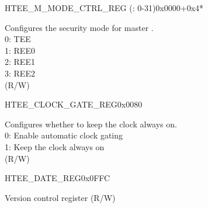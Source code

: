 \begin{register}{H}{TEE\_M\_MODE\_CTRL\_REG (: 0-31)}{0x0000+0x4*}\label{regdesc:TEEM0MODECTRLREG}
%
%
\regnewline%
\begin{regdesc}\begin{reglist}
\label{fielddesc:TEEM0MODE}\item [TEE\_M\regindex{n}\_MODE] Configures the security mode for master .\\ 
0: TEE \\
1: REE0 \\
2: REE1 \\
3: REE2  \\
(R/W)
\end{reglist}\end{regdesc}
\end{register}

\begin{register}{H}{TEE\_CLOCK\_GATE\_REG}{0x0080}\label{regdesc:TEECLOCKGATEREG}
%
%
\regnewline%
\begin{regdesc}\begin{reglist}
\label{fielddesc:TEECLKEN}\item [TEE\_CLK\_EN] Configures whether to keep the clock always on.\\ 
0: Enable automatic clock gating \\ 
1: Keep the clock always on  \\ (R/W)
\end{reglist}\end{regdesc}
\end{register}


\begin{register}{H}{TEE\_DATE\_REG}{0x0FFC}\label{regdesc:TEEDATEREG}
%
%
\regnewline%
\begin{regdesc}\begin{reglist}
\label{fielddesc:TEEDATEREG}\item [TEE\_DATE\_REG] Version control register (R/W)
\end{reglist}\end{regdesc}
\end{register}
